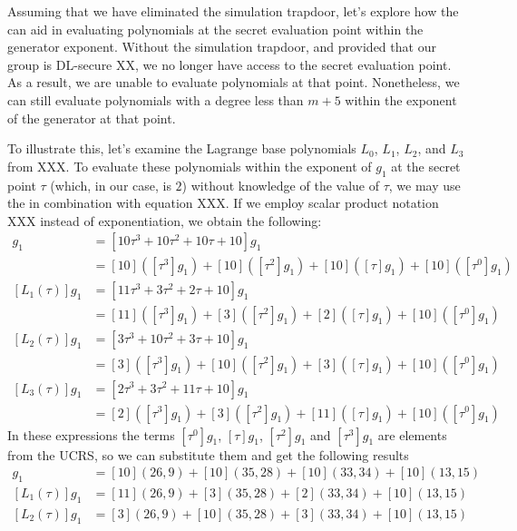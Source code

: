 \begin{example}
Assuming that we have eliminated the simulation trapdoor, let's explore how the  can aid in evaluating polynomials at the secret evaluation point within the generator exponent. Without the simulation trapdoor, and provided that our group is DL-secure XX, we no longer have access to the secret evaluation point. As a result, we are unable to evaluate polynomials at that point. Nonetheless, we can still evaluate polynomials with a degree less than $m+5$ within the exponent of the generator at that point.

To illustrate this, let's examine the Lagrange base polynomials $L_0$, $L_1$, $L_2$, and $L_3$ from XXX. To evaluate these polynomials within the exponent of $g_1$ at the secret point $\tau$ (which, in our case, is $2$) without knowledge of the value of $\tau$, we may use the  in combination with equation XXX. If we employ scalar product notation XXX instead of exponentiation, we obtain the following:
\begin{align*}
[L_0(\tau)]g_1 & = [10\tau^3 + 10 \tau^2 +10\tau + 10] g_1 \\
               & = [10]([\tau^3]g_1) + [10]([\tau^2]g_1) + [10]([\tau]g_1) + [10]([\tau^0] g_1)\\
[L_1(\tau)]g_1 & = [11\tau^3 +3\tau^2 +2\tau + 10] g_1 \\
               & = [11]([\tau^3]g_1) +[3]([\tau^2]g_1) +[2]([\tau]g_1) + [10]([\tau^0] g_1) \\
[L_2(\tau)]g_1 & = [3\tau^3 +10\tau^2+ 3\tau + 10] g_1 \\
               & = [3]([\tau^3]g_1) + [10]([\tau^2]g_1) + [3]([\tau]g_1) + [10]([\tau^0]g_1) \\
[L_3(\tau)]g_1 & = [2\tau^3 + 3\tau^2 +11\tau +10 ] g_1 \\
               & = [2]([\tau^3]g_1) + [3]([\tau^2]g_1) +[11]([\tau]g_1) +[10]([\tau^0]g_1)
\end{align*}
In these expressions the terms $[\tau^0]g_1$, $[\tau]g_1$, $[\tau^2]g_1$ and $[\tau^3]g_1$ are elements from the UCRS, so we can substitute them and get the following results
\begin{align*}
[L_0(\tau)]g_1 & = [10](26,9)+[10](35,28)+[10](33,34) + [10](13,15)\\
[L_1(\tau)]g_1 & = [11](26,9) +[3](35,28) +[2](33,34) + [10](13,15)\\
[L_2(\tau)]g_1 & = [3](26,9) + [10](35,28) + [3](33,34) + [10](13,15)\\

\end{align*}
\end{example}
